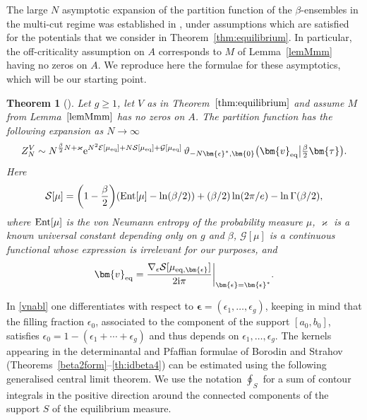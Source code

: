 \documentclass[10pt,a4paper]{amsart}
\numberwithin{equation}{section}
\newtheorem{Theorem}{Theorem}[section]
\begin{document}
The large $N$ asymptotic expansion of the partition function of the
$\beta$-ensembles in the multi-cut regime was established in \cite{BGmulti}, under
assumptions which are satisfied for the potentials that we consider in
Theorem~\ref{thm:equilibrium}. In particular, the off-criticality assumption on $A$ corresponds to $M$ of Lemma~\ref{lemMmm} having no zeros on $A$. We reproduce here the formulae for these asymptotics, which will be our starting point.


\begin{Theorem}[{\cite[Theorem 1.5]{BGmulti}}]
\label{Asymppart}Let $g \geq 1$, let $V$ as in Theorem~$\ref{thm:equilibrium}$ and assume $M$ from Lemma~$\ref{lemMmm}$ has no zeros on $A$. The partition function has the following expansion
as $N \to \infty$
\[
 Z^{V}_{N} \sim N^{\frac{\beta}{2}N + \varkappa}{\rm e}^{N^{2}\mathcal{E}[\mu_{{\rm eq}}] + N\mathcal{S}[\mu_{{\rm eq}}] + \mathcal{G}[\mu_{{\rm eq}}]}\,\vartheta_{-N\bm{\epsilon}^{*},\bm{0}}\bigl(\bm{v}_{{\rm eq}}\big| \tfrac{\beta}{2}\bm{\tau}\bigr).
\]
Here
\[
\mathcal{S}[\mu] = \biggl(1 - \frac{\beta}{2}\biggr)({\rm Ent}[\mu] - \ln(\beta/2)) + (\beta/2)\ln(2\pi/e) - \ln \Gamma(\beta/2),
\]
where ${\rm Ent}[\mu]$ is the von Neumann entropy of the probability measure $\mu$, $\varkappa$ is a known universal constant depending only on $g$ and $\beta$, $\mathcal{G}[\mu]$ is a continuous functional whose expression is irrelevant for our purposes, and
\begin{equation}
\label{vnabl}\bm{v}_{{\rm eq}} = \frac{\nabla_{\epsilon} \mathcal{S}[\mu_{{\rm eq},\bm{\epsilon}}]}{2{\rm i}\pi}\bigg|_{\bm{\epsilon} = \bm{\epsilon}^*} .
\end{equation}
\end{Theorem}
In \eqref{vnabl} one differentiates with respect to $\bm{\epsilon} = (\epsilon_1,\ldots,\epsilon_g)$,
keeping in mind that the filling fraction $\epsilon_{0}$, associated to the
component of the support $[a_{0}, b_{0}]$, satisfies
$\epsilon_0 = 1 - (\epsilon_1 + \cdots + \epsilon_g)$ and thus depends on
$\epsilon_{1}, \ldots, \epsilon_{g}$. The kernels appearing in the determinantal and
Pfaffian formulae of Borodin and Strahov (Theorems~\ref{beta2form}--\ref{th:idbeta4}) can be
estimated using the following generalised central limit theorem. We
use the notation $\oint_{S}$ for a sum of contour integrals in the
positive direction around the connected components of the support $S$
of the equilibrium measure.
\end{document}
